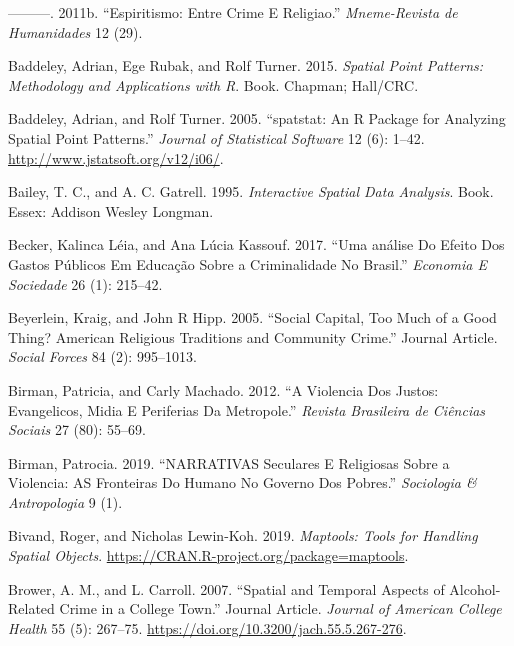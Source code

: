 \documentclass[smallextended]{svjour3}       %
\begin{document}
\leavevmode\hypertarget{ref-Arribas2011espiritismo}{}%
---------. 2011b. ``Espiritismo: Entre Crime E Religiao.''
\emph{Mneme-Revista de Humanidades} 12 (29).

\leavevmode\hypertarget{ref-Baddeley2015spatial}{}%
Baddeley, Adrian, Ege Rubak, and Rolf Turner. 2015. \emph{Spatial Point
Patterns: Methodology and Applications with R}. Book. Chapman; Hall/CRC.

\leavevmode\hypertarget{ref-Baddeley2005spatstat}{}%
Baddeley, Adrian, and Rolf Turner. 2005. ``spatstat: An R Package for
Analyzing Spatial Point Patterns.'' \emph{Journal of Statistical
Software} 12 (6): 1--42. \url{http://www.jstatsoft.org/v12/i06/}.

\leavevmode\hypertarget{ref-Bailey1995interactive}{}%
Bailey, T. C., and A. C. Gatrell. 1995. \emph{Interactive Spatial Data
Analysis}. Book. Essex: Addison Wesley Longman.

\leavevmode\hypertarget{ref-Becker2017analise}{}%
Becker, Kalinca Léia, and Ana Lúcia Kassouf. 2017. ``Uma análise Do
Efeito Dos Gastos Públicos Em Educação Sobre a Criminalidade No
Brasil.'' \emph{Economia E Sociedade} 26 (1): 215--42.

\leavevmode\hypertarget{ref-Beyerlein2005social}{}%
Beyerlein, Kraig, and John R Hipp. 2005. ``Social Capital, Too Much of a
Good Thing? American Religious Traditions and Community Crime.'' Journal
Article. \emph{Social Forces} 84 (2): 995--1013.

\leavevmode\hypertarget{ref-Birman2012violencia}{}%
Birman, Patricia, and Carly Machado. 2012. ``A Violencia Dos Justos:
Evangelicos, Midia E Periferias Da Metropole.'' \emph{Revista Brasileira
de Ciências Sociais} 27 (80): 55--69.

\leavevmode\hypertarget{ref-Birman2019narrativas}{}%
Birman, Patrocia. 2019. ``NARRATIVAS Seculares E Religiosas Sobre a
Violencia: AS Fronteiras Do Humano No Governo Dos Pobres.''
\emph{Sociologia \& Antropologia} 9 (1).

\leavevmode\hypertarget{ref-Bivand2019maptools}{}%
Bivand, Roger, and Nicholas Lewin-Koh. 2019. \emph{Maptools: Tools for
Handling Spatial Objects}.
\url{https://CRAN.R-project.org/package=maptools}.

\leavevmode\hypertarget{ref-Brower2007spatial}{}%
Brower, A. M., and L. Carroll. 2007. ``Spatial and Temporal Aspects of
Alcohol-Related Crime in a College Town.'' Journal Article.
\emph{Journal of American College Health} 55 (5): 267--75.
\url{https://doi.org/10.3200/jach.55.5.267-276}.
\end{document}

